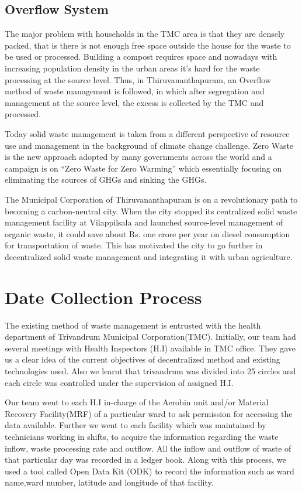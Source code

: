 \documentclass[12pt,a4paper]{  report}
\begin{document}
\section{Overflow System}
\begin{justify}
	The major problem with households in the TMC area is that they are densely packed, that is there is not enough free space outside the house for the waste to be used or processed. Building a compost requires space and nowadays with increasing population density in the urban areas it's hard for the waste processing at the source level. Thus, in Thiruvananthapuram, an Overflow method of waste management is followed, in which after segregation and management at the source level, the excess is collected by the TMC and processed.
	
	Today solid waste management is taken from a different perspective of resource use and management in the background of climate change challenge. Zero Waste is the new approach adopted by many governments across the world and a campaign is on “Zero Waste for Zero Warming” which essentially focusing on eliminating the sources of GHGs and sinking the GHGs.
	
	The Municipal Corporation of Thiruvananthapuram is on a revolutionary path to becoming a carbon-neutral city. When the city stopped its centralized solid waste management facility at Vilappilsala and launched source-level management of organic waste, it could save about Rs. one crore per year on diesel consumption for transportation of waste. This has motivated the city to go further in decentralized solid waste management and integrating it with urban agriculture.
	
\end{justify}

\chapter{\textbf{Date Collection Process}}
The existing method of waste management is entrusted with the health department of Trivandrum Municipal Corporation(TMC). Initially, our team had several meetings with Health Inspectors (H.I) available in TMC office. They gave us a clear idea of the current objectives of decentralized method and existing technologies used. Also we learnt that trivandrum was divided into 25 circles and each circle was controlled under the supervision of assigned H.I.

Our team went to each H.I in-charge of the Aerobin unit and/or Material Recovery Facility(MRF) of a particular ward to ask permission for accessing the data available. Further we went to each facility which was maintained by technicians working in shifts, to acquire the information regarding the waste inflow, waste processing rate and outflow. All the inflow and outflow of waste of that particular day was recorded in a ledger book. Along with this process, we used a tool called Open Data Kit (ODK) to record the information such as ward name,ward number, latitude and longitude of that facility.
\end{document}

